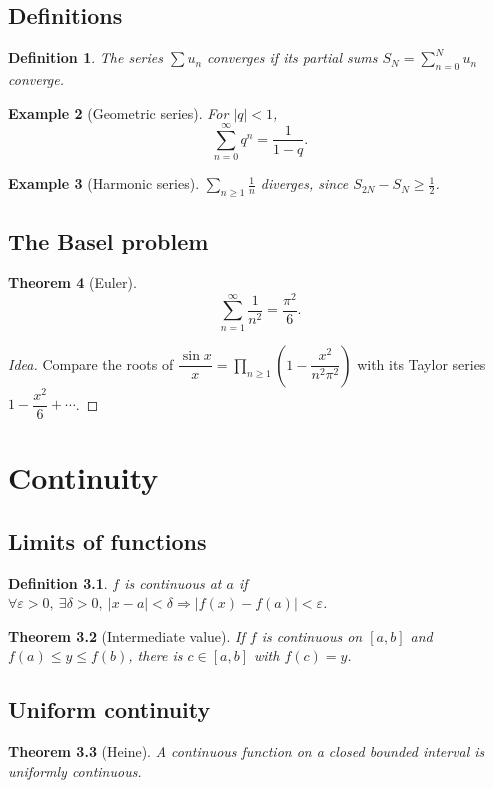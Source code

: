 \documentclass[11pt,oneside,openany]{book}
\newtheorem{theorem}{Theorem}[chapter]
\newtheorem{definition}[theorem]{Definition}
\newtheorem{example}[theorem]{Example}
\begin{document}
\section{Definitions}
\begin{definition} The series $\sum u_n$ converges if its partial sums $S_N = \sum_{n=0}^{N} u_n$ converge. \end{definition}
\begin{example}[Geometric series] For $|q| < 1$, \[ \sum_{n=0}^{\infty} q^n = \frac{1}{1-q}. \] \end{example}
\begin{example}[Harmonic series] $\displaystyle\sum_{n\ge1} \frac1n$ diverges, since $S_{2N} - S_N \ge \frac12$. \end{example}
\section{The Basel problem}
\begin{theorem}[Euler] \[ \sum_{n=1}^{\infty} \frac{1}{n^2} = \frac{\pi^2}{6}. \] \end{theorem}
\begin{proof}[Idea] Compare the roots of $\dfrac{\sin x}{x} = \prod_{n \ge 1}\left(1 - \dfrac{x^2}{n^2\pi^2}\right)$ with its Taylor series $1 - \dfrac{x^2}{6} + \cdots$. \end{proof}
\chapter{Continuity}
\section{Limits of functions}
\begin{definition} $f$ is continuous at $a$ if $\forall \varepsilon>0,\ \exists \delta>0,\ |x-a|<\delta \Rightarrow |f(x)-f(a)|<\varepsilon$. \end{definition}
\begin{theorem}[Intermediate value] If $f$ is continuous on $[a,b]$ and $f(a) \le y \le f(b)$, there is $c \in [a,b]$ with $f(c) = y$. \end{theorem}
\section{Uniform continuity}
\begin{theorem}[Heine] A continuous function on a closed bounded interval is uniformly continuous. \end{theorem}
\end{document}
